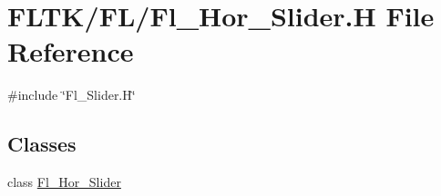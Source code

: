 \hypertarget{_fl___hor___slider_8_h}{}\section{F\+L\+T\+K/\+F\+L/\+Fl\+\_\+\+Hor\+\_\+\+Slider.H File Reference}
\label{_fl___hor___slider_8_h}
{\ttfamily \#include \char`\"{}Fl\+\_\+\+Slider.\+H\char`\"{}}\newline
\subsection*{Classes}
\begin{DoxyCompactItemize}
\item 
class \hyperlink{class_fl___hor___slider}{Fl\+\_\+\+Hor\+\_\+\+Slider}
\end{DoxyCompactItemize}
